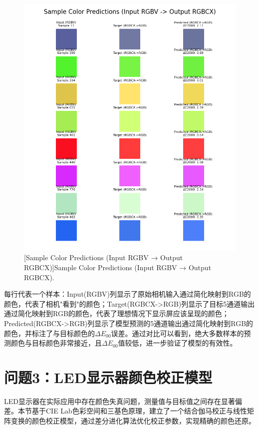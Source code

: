 \begin{figure}[H]
\centering
{}
\includegraphics[width=0.8\columnwidth]{figures/Sample.png}
[Sample Color Predictions (Input RGBV → Output RGBCX)]{Sample Color Predictions (Input RGBV → Output RGBCX).}
\label{figure2: sample_predictions}
\end{figure}

每行代表一个样本：Input(RGBV)列显示了原始相机输入通过简化映射到RGB的颜色，代表了相机"看到"的颜色；Target(RGBCX->RGB)列显示了目标5通道输出通过简化映射到RGB的颜色，代表了理想情况下显示屏应该呈现的颜色；Predicted(RGBCX->RGB)列显示了模型预测的5通道输出通过简化映射到RGB的颜色，并标注了与目标颜色的$\Delta E_{00}$误差。通过对比可以看到，绝大多数样本的预测颜色与目标颜色非常接近，且$\Delta E_{00}$值较低，进一步验证了模型的有效性。

\section[\hspace{-2pt}问题3：LED显示器颜色校正模型]{{\heiti{} \hspace{-8pt}问题3：LED显示器颜色校正模型}}\label{section4: 问题3：LED显示器颜色校正模型}

LED显示器在实际应用中存在颜色失真问题，测量值与目标值之间存在显著偏差。本节基于CIE Lab色彩空间和三基色原理，建立了一个结合伽马校正与线性矩阵变换的颜色校正模型，通过差分进化算法优化校正参数，实现精确的颜色还原。

